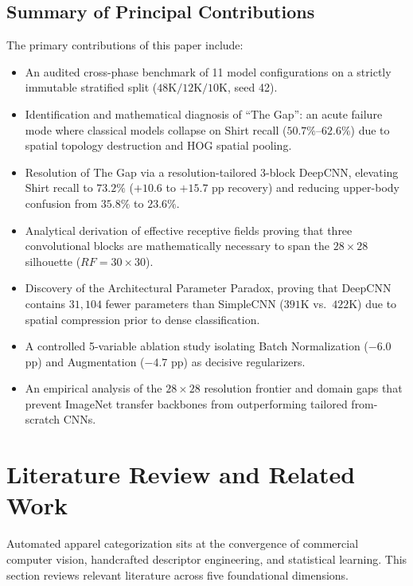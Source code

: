 \documentclass[conference]{IEEEtran}
\begin{document}
\subsection{Summary of Principal Contributions}
The primary contributions of this paper include:
\begin{itemize}
    \item An audited cross-phase benchmark of 11 model configurations on a strictly immutable stratified split ($48\text{K}/12\text{K}/10\text{K}$, seed 42).
    \item Identification and mathematical diagnosis of ``The Gap'': an acute failure mode where classical models collapse on Shirt recall ($50.7\%$--$62.6\%$) due to spatial topology destruction and HOG spatial pooling.
    \item Resolution of The Gap via a resolution-tailored 3-block DeepCNN, elevating Shirt recall to $73.2\%$ ($+10.6$ to $+15.7$ pp recovery) and reducing upper-body confusion from $35.8\%$ to $23.6\%$.
    \item Analytical derivation of effective receptive fields proving that three convolutional blocks are mathematically necessary to span the $28\times28$ silhouette ($RF = 30 \times 30$).
    \item Discovery of the Architectural Parameter Paradox, proving that DeepCNN contains $31{,}104$ fewer parameters than SimpleCNN ($391\text{K}$ vs.\ $422\text{K}$) due to spatial compression prior to dense classification.
    \item A controlled 5-variable ablation study isolating Batch Normalization ($-6.0$ pp) and Augmentation ($-4.7$ pp) as decisive regularizers.
    \item An empirical analysis of the $28 \times 28$ resolution frontier and domain gaps that prevent ImageNet transfer backbones from outperforming tailored from-scratch CNNs.
\end{itemize}

\section{Literature Review and Related Work}\label{sec:litreview}\label{sec:related}

Automated apparel categorization sits at the convergence of commercial computer vision, handcrafted descriptor engineering, and statistical learning. This section reviews relevant literature across five foundational dimensions.
\end{document}
